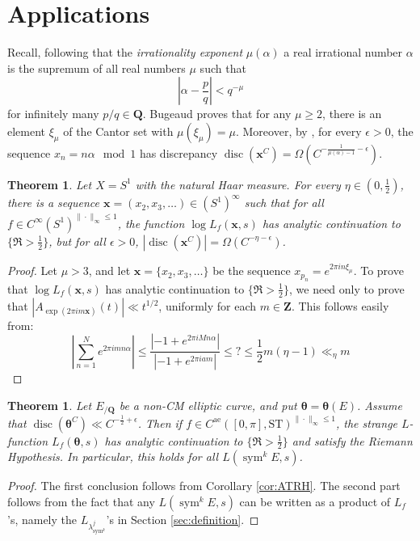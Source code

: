 \documentclass{article}
\DeclareMathOperator{\disc}{disc}
\DeclareMathOperator{\sym}{sym}
\newcommand{\bQ}{\mathbf{Q}}
\newcommand{\btheta}{{\boldsymbol{\theta}}}
\newcommand{\bx}{{\boldsymbol x}}
\newcommand{\bZ}{\mathbf{Z}}
\newcommand{\alev}{\mathrm{ae}}
\newcommand{\ST}{\mathrm{ST}}
\newtheorem{theorem}[subsection]{Theorem}
\theoremstyle{definition}
\begin{document}
\section{Applications}\label{sec:application}


Recall, following \cite{bugeaud-2008} that the \emph{irrationality exponent} 
$\mu(\alpha)$ a real irrational number $\alpha$ is the supremum of all real 
numbers $\mu$ such that 
\[
	\left|\alpha-\frac{p}{q}\right| < q^{-\mu}
\]
for infinitely many $p/q\in \bQ$. Bugeaud proves that for any 
$\mu\geqslant 2$, there is an element $\xi_\mu$ of the Cantor set with 
$\mu(\xi_\mu)=\mu$. Moreover, by \cite[?]{kuipers-niederreiter-1974}, for 
every $\epsilon>0$, the sequence $x_n=n\alpha\mod 1$ has discrepancy 
$\disc(\bx^C)=\Omega(C^{-\frac{1}{\mu(\alpha)-1}-\epsilon})$. 

\begin{theorem}
Let $X=S^1$ with the natural Haar measure. For every $\eta\in (0,\frac 1 2)$, 
there is a sequence $\bx=(x_2,x_3,\dots)\in (S^1)^\infty$ such that for all 
$f\in C^\infty(S^1)^{\|\cdot\|_\infty\leqslant 1}$, the function 
$\log L_f(\bx,s)$ has analytic continuation to $\{\Re>\frac 1 2\}$, but for 
all $\epsilon>0$, $|\disc(\bx^C)|=\Omega(C^{-\eta-\epsilon})$. 
\end{theorem}
\begin{proof}
Let $\mu>3$, and let 
$\bx=\{x_2,x_3,\dots\}$ be the sequence $x_{p_n}=e^{2\pi i n \xi_\mu}$. To 
prove that $\log L_f(\bx,s)$ has analytic continuation to $\{\Re >\frac 1 2\}$, 
we need only to prove that $|A_{\exp(2\pi i m \bx)}(t)| \ll t^{1/2}$, uniformly 
for each $m\in \bZ$. This follows easily from:
\[
	\left| \sum_{n=1}^N e^{2\pi i m n \alpha}\right| \leqslant \frac{|-1+e^{2\pi i M n \alpha}|}{|-1+e^{2\pi i a m}|} \leqslant ? \leqslant \frac 1 2 m (\eta-1) \ll_\eta m
\]
\end{proof}

\begin{theorem}
Let $E_{/\bQ}$ be a non-CM elliptic curve, and put $\btheta=\btheta(E)$. 
Assume that $\disc(\btheta^C) \ll C^{-\frac 1 2+\epsilon}$. Then if 
$f\in C^\alev([0,\pi],\ST)^{\|\cdot\|_\infty\leqslant 1}$, the strange 
$L$-function $L_f(\btheta,s)$ has analytic continuation to 
$\{\Re >\frac 1 2\}$ and satisfy the Riemann Hypothesis. In particular, 
this holds for all $L(\sym^k E,s)$. 
\end{theorem}
\begin{proof}
The first conclusion follows from Corollary \ref{cor:ATRH}. The second part follows 
from the fact that any $L(\sym^k E,s)$ can be written as a product of $L_f$'s, 
namely the $L_{\lambda_{\sym^k}^j}$'s in Section \ref{sec:definition}.  
\end{proof}
\end{document}
